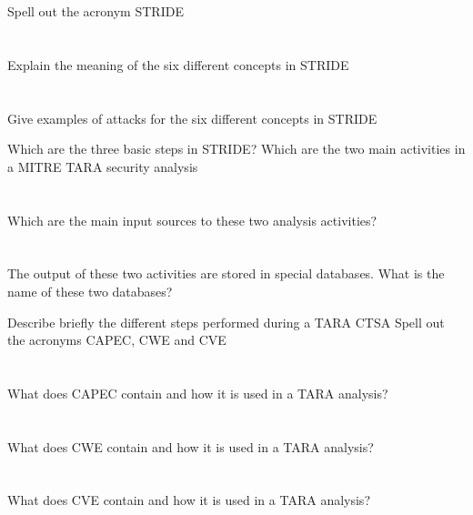\begin{questions}
\question{} Spell out the acronym STRIDE
  \begin{parts}
  \part{} Explain the meaning of the six different concepts in STRIDE
  \part{} Give examples of attacks for the six different concepts in STRIDE
  \end{parts}

\question{} Which are the three basic steps in STRIDE?\@
\question{} Which are the two main activities in a MITRE TARA security analysis
  \begin{parts}
  \part{} Which are the main input sources to these two analysis
    activities?
  \part{} The output of these two activities are stored in special databases. What is the name of these two databases?
  \end{parts}

\question{} Describe briefly the different steps performed during a TARA CTSA
\question{} Spell out the acronyms CAPEC, CWE and CVE
  \begin{parts}
  \part{} What does CAPEC contain and how it is used in a TARA analysis?
  \part{} What does CWE contain and how it is used in a TARA analysis?
  \part{} What does CVE contain and how it is used in a TARA analysis?
  \end{parts}


\end{questions}
